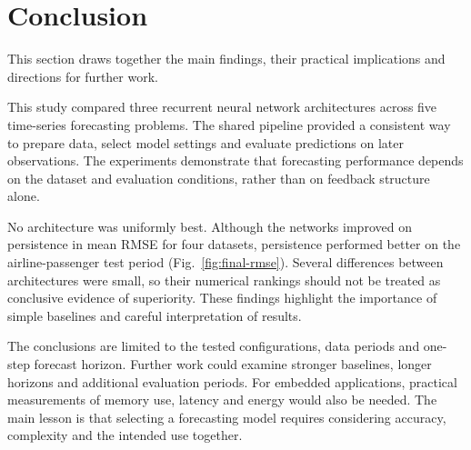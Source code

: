 \section{Conclusion}
\label{sec:conclusion}

This section draws together the main findings, their practical implications
and directions for further work.

This study compared three recurrent neural network architectures across five
time-series forecasting problems. The shared pipeline provided a consistent way
to prepare data, select model settings and evaluate predictions on later
observations. The experiments demonstrate that forecasting performance depends
on the dataset and evaluation conditions, rather than on feedback structure
alone.

No architecture was uniformly best. Although the networks improved on
persistence in mean RMSE for four datasets, persistence performed better on the
airline-passenger test period (Fig.~\ref{fig:final-rmse}). Several differences
between architectures were small, so their numerical rankings should not be
treated as conclusive evidence of superiority. These findings highlight the
importance of simple baselines and careful interpretation of results.

The conclusions are limited to the tested configurations, data periods and
one-step forecast horizon. Further work could examine stronger baselines, longer
horizons and additional evaluation periods. For embedded applications, practical
measurements of memory use, latency and energy would also be needed. The main
lesson is that selecting a forecasting model requires considering accuracy,
complexity and the intended use together.
